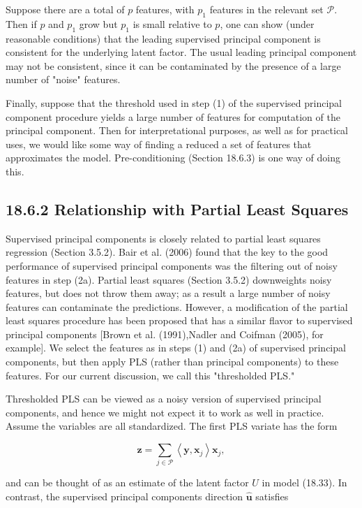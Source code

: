 \documentclass[10pt]{article}
\begin{document}
Suppose there are a total of $p$ features, with $p_{1}$ features in the relevant set $\mathcal{P}$. Then if $p$ and $p_{1}$ grow but $p_{1}$ is small relative to $p$, one can show (under reasonable conditions) that the leading supervised principal component is consistent for the underlying latent factor. The usual leading principal component may not be consistent, since it can be contaminated by the presence of a large number of "noise" features.

Finally, suppose that the threshold used in step (1) of the supervised principal component procedure yields a large number of features for computation of the principal component. Then for interpretational purposes, as well as for practical uses, we would like some way of finding a reduced a set of features that approximates the model. Pre-conditioning (Section 18.6.3) is one way of doing this.

\subsection*{18.6.2 Relationship with Partial Least Squares}
Supervised principal components is closely related to partial least squares regression (Section 3.5.2). Bair et al. (2006) found that the key to the good performance of supervised principal components was the filtering out of noisy features in step (2a). Partial least squares (Section 3.5.2) downweights noisy features, but does not throw them away; as a result a large number of noisy features can contaminate the predictions. However, a modification of the partial least squares procedure has been proposed that has a similar flavor to supervised principal components [Brown et al. (1991),Nadler and Coifman (2005), for example]. We select the features as in steps (1) and (2a) of supervised principal components, but then apply PLS (rather than principal components) to these features. For our current discussion, we call this "thresholded PLS."

Thresholded PLS can be viewed as a noisy version of supervised principal components, and hence we might not expect it to work as well in practice. Assume the variables are all standardized. The first PLS variate has the form


\begin{equation*}
\mathbf{z}=\sum_{j \in \mathcal{P}}\left\langle\mathbf{y}, \mathbf{x}_{j}\right\rangle \mathbf{x}_{j}, \tag{18.34}
\end{equation*}


and can be thought of as an estimate of the latent factor $U$ in model (18.33). In contrast, the supervised principal components direction $\hat{\mathbf{u}}$ satisfies
\end{document}

